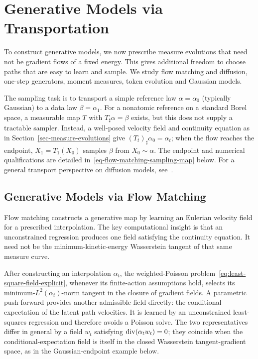 
\chapter{Generative Models via Transportation}
\label{sec-generative-models-transportation}

To construct generative models, we now prescribe measure evolutions that need not be gradient flows of a fixed energy. This gives additional freedom to choose paths that are easy to learn and sample. We study flow matching and diffusion, one-step generators, moment measures, token evolution and Gaussian models.

The sampling task is to transport a simple reference law $\alpha=\alpha_0$ (typically Gaussian) to a data law $\beta=\alpha_1$. For a nonatomic reference on a standard Borel space, a measurable map $T$ with $T_\sharp\alpha=\beta$ exists, but this does not supply a tractable sampler. Instead, a well-posed velocity field and continuity equation as in Section~\ref{sec-measure-evolutions} give $(T_t)_\sharp\alpha_0=\alpha_t$; when the flow reaches the endpoint, $X_1=T_1(X_0)$ samples $\beta$ from $X_0\sim\alpha$. The endpoint and numerical qualifications are detailed in~\eqref{eq-flow-matching-sampling-map} below. For a general transport perspective on diffusion models, see~\cite{Peyre2026OptimalDiffusionTransports}.

\section{Generative Models via Flow Matching}
\label{sec-generative-flow-matching}

Flow matching constructs a generative map by learning an Eulerian velocity field for a prescribed interpolation. The key computational insight is that an unconstrained regression produces one field satisfying the continuity equation. It need not be the minimum-kinetic-energy Wasserstein tangent of that same measure curve.

After constructing an interpolation $\alpha_t$, the weighted-Poisson problem~\eqref{eq:least-square-field-explicit}, whenever its finite-action assumptions hold, selects its minimum-\(L^2(\alpha_t)\)-norm tangent in the closure of gradient fields. A parametric push-forward provides another admissible field directly: the conditional expectation of the latent path velocities. It is learned by an unconstrained least-squares regression and therefore avoids a Poisson solve. The two representatives differ in general by a field \(w_t\) satisfying \(\operatorname{div}(\alpha_t w_t)=0\); they coincide when the conditional-expectation field is itself in the closed Wasserstein tangent-gradient space, as in the Gaussian-endpoint example below.

